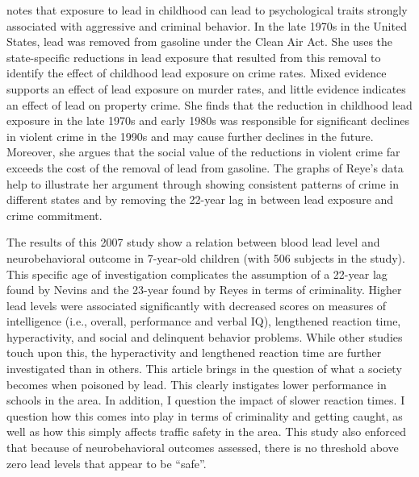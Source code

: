 \documentclass{article}
\begin{document}
\medskip

\noindent {}

\medskip

\cite{reyes_2007} notes that exposure to lead in childhood can lead to psychological traits strongly associated with aggressive and criminal behavior. In the late 1970s in the United States, lead was removed from gasoline under the Clean Air Act. She uses the state-specific reductions in lead exposure that resulted from this removal to identify the effect of childhood lead exposure on crime rates. Mixed evidence supports an effect of lead exposure on murder rates, and little evidence indicates an effect of lead on property crime. She finds that the reduction in childhood lead exposure in the late 1970s and early 1980s was responsible for significant declines in violent crime in the 1990s and may cause further declines in the future. Moreover, she argues that the social value of the reductions in violent crime far exceeds the cost of the removal of lead from gasoline. The graphs of Reye’s data help to illustrate her argument through showing consistent patterns of crime in different states and by removing the 22-year lag in between lead exposure and crime commitment. 

\medskip

\noindent {}

\medskip

The results of this 2007 study show a relation between blood lead level and neurobehavioral outcome in 7-year-old children (with 506 subjects  in the study). This specific age of investigation complicates the assumption of a 22-year lag found by Nevins and the 23-year found by Reyes in terms of criminality. Higher lead levels were associated significantly with decreased scores on measures of intelligence (i.e., overall, performance and verbal IQ), lengthened reaction time, hyperactivity, and social and delinquent behavior problems. While other studies touch upon this, the hyperactivity and lengthened reaction time are further investigated than in others. This article brings in the question of what a society becomes when poisoned by lead. This clearly instigates lower performance in schools in the area. In addition, I question the impact of slower reaction times. I question how this comes into play in terms of criminality and getting caught, as well as how this simply affects traffic safety in the area. This study also enforced that because of neurobehavioral outcomes assessed, there is no threshold above zero lead levels that appear to be ``safe''.
\end{document}
